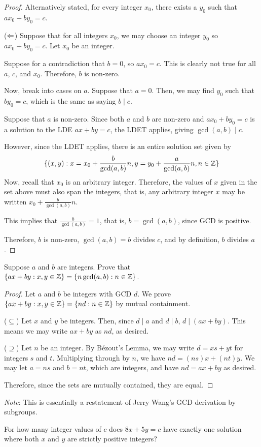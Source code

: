 \begin{enumerate}[(a)]
\begin{proof}
          Alternatively stated, for every integer $x_0$, there exists a $y_0$ such that $ax_0+by_0=c$.

          ($\Leftarrow$) Suppose that for all integers $x_0$, we may choose an integer $y_0$ so $ax_0+by_0=c$.
          Let $x_0$ be an integer.

          Suppose for a contradiction that $b=0$, so $ax_0=c$.
          This is clearly not true for all $a$, $c$, and $x_0$.
          Therefore, $b$ is non-zero.
          
          Now, break into cases on $a$.
          Suppose that $a=0$. 
          Then, we may find $y_0$ such that $by_0=c$, which is the same as saying $b \mid c$.

          Suppose that $a$ is non-zero.
          Since both $a$ and $b$ are non-zero and $ax_0+by_0=c$ is a solution to the LDE $ax+by=c$,
          the LDET applies, giving $\gcd(a,b) \mid c$.

          However, since the LDET applies, there is an entire solution set given by
          \begin{equation*}
            \{(x,y) : x=x_0+\frac{b}{\gcd(a,b)}n, y=y_0+\frac{a}{\gcd(a,b)}n, n\in\mathbb{Z}\}
          \end{equation*}
          Now, recall that $x_0$ is an arbitrary integer.
          Therefore, the values of $x$ given in the set above must also span the integers, that is,
          any arbitrary integer $x$ may be written $x_0+\frac{b}{\gcd(a,b)}n$.

          This implies that $\frac{b}{\gcd(a,b)}=1$, that is, $b=\gcd(a,b)$, since GCD is positive.

          Therefore, $b$ is non-zero, $\gcd(a,b)=b$ divides $c$, and by definition, $b$ divides $a$.
        \end{proof}
\end{enumerate}


\question Suppose $a$ and $b$ are integers.
Prove that $\{ax+by : x,y\in\mathbb{Z}\} = {\{n\gcd(a,b) : n\in\mathbb{Z}\}}$.
\begin{proof}
  Let $a$ and $b$ be integers with GCD $d$.
  We prove $\{ax+by : x,y\in\mathbb{Z}\}=\{nd : n\in\mathbb{Z}\}$ by mutual containment.

  ($\subseteq$) Let $x$ and $y$ be integers.
  Then, since $d \mid a$ and $d \mid b$, $d \mid (ax+by)$.
  This means we may write $ax+by$ as $nd$, as desired.

  ($\supseteq$) Let $n$ be an integer.
  By Bézout's Lemma, we may write $d=xs+yt$ for integers $s$ and $t$.
  Multiplying through by $n$, we have $nd=(ns)x+(nt)y$.
  We may let $a=ns$ and $b=nt$, which are integers, and have $nd=ax+by$ as desired.

  Therefore, since the sets are mutually contained, they are equal.
\end{proof}

\emph{Note}: This is essentially a restatement of Jerry Wang's GCD derivation by subgroups.



\question For how many integer values of $c$ does $8x+5y=c$ have exactly one solution
where both $x$ and $y$ are strictly positive integers?


